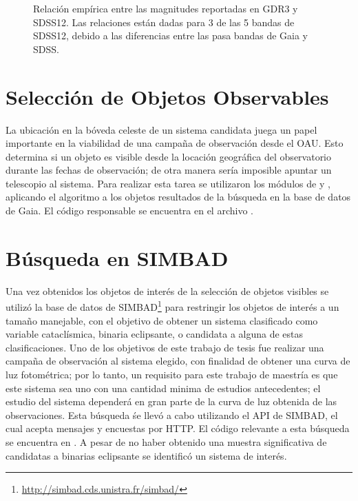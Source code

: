 \begin{figure}[!ht]
	\caption{Relación empírica entre las magnitudes reportadas en GDR3 y SDSS12. Las relaciones están dadas para 3 de las 5 bandas de SDSS12, debido a las diferencias entre las pasa bandas de Gaia y SDSS. \autocite{gdr3ReleaseDocumentation}}
	\label{gdr3SdssConversionGraphs}
\end{figure}

\section{Selección de Objetos Observables} \label{muestra:crit_seleccion:objetos_observables}

La ubicación en la bóveda celeste de un sistema candidata juega un papel
importante en la viabilidad de una campaña de observación desde el OAU. Esto
determina si un objeto es visible desde la locación geográfica del observatorio
durante las fechas de observación; de otra manera sería imposible apuntar un
telescopio al sistema. Para realizar esta tarea se utilizaron los módulos de
 \autocite{astroplan} y  \autocite{astropy}, aplicando
el algoritmo a los objetos resultados de la búsqueda en la base de datos de
Gaia. El código responsable se encuentra en el archivo
\href{https://github.com/KnightIV/UANL_MAPTA_Observaciones/blob/main/obsrv_plan/gaia/observable_targets.py}{}.


\section{Búsqueda en SIMBAD} \label{muestra:crit_seleccion:busqueda_simbad}

Una vez obtenidos los objetos de interés de la selección de objetos visibles se
utilizó la base de datos de
SIMBAD\footnote{\url{http://simbad.cds.unistra.fr/simbad/}}
\autocite{simbadDatabase} para restringir los objetos de interés a un tamaño
manejable, con el objetivo de obtener un sistema clasificado como variable
cataclísmica, binaria eclipsante, o candidata a alguna de estas clasificaciones.
Uno de los objetivos de este trabajo de tesis fue realizar una campaña de
observación al sistema elegido, con finalidad de obtener una curva de luz
fotométrica; por lo tanto, un requisito para este trabajo de maestría es que
este sistema sea uno con una cantidad minima de estudios antecedentes; el
estudio del sistema dependerá en gran parte de la curva de luz obtenida de las
observaciones. Esta búsqueda śe llevó a cabo utilizando el API de SIMBAD, el
cual acepta mensajes y encuestas por HTTP. El código relevante a esta búsqueda
se encuentra en
\href{https://github.com/KnightIV/UANL_MAPTA_Observaciones/blob/main/obsrv_plan/simbad/retrieve_vots.py}{}.
A pesar de no haber obtenido una muestra significativa de candidatas a binarias
eclipsante se identificó un sistema de interés.

